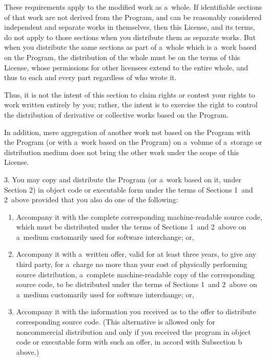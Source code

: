 \documentclass[a4paper, 11pt, twoside]{article}
\begin{document}
These requirements apply to the modified work as a~whole. If identifiable sections of that work are not derived from the Program, and can be reasonably considered independent and separate works in themselves, then this License, and its terms, do not apply to those sections when you distribute them as separate works. But when you distribute the same sections as part of a~whole which is a~work based on the Program, the distribution of the whole must be on the terms of this License, whose permissions for other licensees extend to the entire whole, and thus to each and every part regardless of who wrote it.

Thus, it is not the intent of this section to claim rights or contest your rights to work written entirely by you; rather, the intent is to exercise the right to control the distribution of derivative or collective works based on the Program.

In addition, mere aggregation of another work not based on the Program with the Program (or with a~work based on the Program) on a~volume of a~storage or distribution medium does not bring the other work under the scope of this License.

3. You may copy and distribute the Program (or a~work based on it, under Section 2) in object code or executable form under the terms of Sections 1~and 2~above provided that you also do one of the following:

\begin{enumerate}[label=\Alph*)]
\item Accompany it with the complete corresponding machine-readable source code, which must be distributed under the terms of Sections 1~and 2~above on a~medium customarily used for software interchange; or,
\item Accompany it with a~written offer, valid for at least three years, to give any third party, for a~charge no more than your cost of physically performing source distribution, a~complete machine-readable copy of the corresponding source code, to be distributed under the terms of Sections 1~and 2~above on a~medium customarily used for software interchange; or,
\item Accompany it with the information you received as to the offer to distribute corresponding source code. (This alternative is allowed only for noncommercial distribution and only if you received the program in object code or executable form with such an offer, in accord with Subsection b above.)
\end{enumerate}
\end{document}

